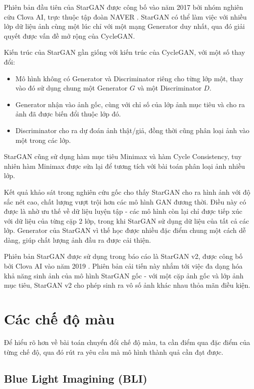 \documentclass[12pt]{extreport}
\begin{document}
Phiên bản đầu tiên của StarGAN được công bố vào năm 2017 bởi nhóm nghiên cứu Clova AI, trực thuộc tập đoàn NAVER \cite{DBLP:journals/corr/abs-1711-09020}. StarGAN có thể làm việc với nhiều lớp dữ liệu ảnh cùng một lúc chỉ với một mạng Generator duy nhất, qua đó giải quyết được vấn đề mở rộng của CycleGAN.

Kiến trúc của StarGAN gần giống với kiến trúc của CycleGAN, với một số thay đổi:
\begin{itemize}
    \item Mô hình không có Generator và Discriminator riêng cho từng lớp một, thay vào đó sử dụng chung một Generator $ G $ và một Discriminator $ D $.
    \item Generator nhận vào ảnh gốc, cùng với chỉ số của lớp ảnh mục tiêu và cho ra ảnh đã được biến đổi thuộc lớp đó.
    \item Discriminator cho ra dự đoán ảnh thật/giả, đồng thời cũng phân loại ảnh vào một trong các lớp.
\end{itemize}

StarGAN cũng sử dụng hàm mục tiêu Minimax và hàm Cycle Consistency, tuy nhiên hàm Minimax được sửa lại để tương tích với bài toán phân loại ảnh nhiều lớp.

Kết quả khảo sát trong nghiên cứu gốc cho thấy StarGAN cho ra hình ảnh với độ sắc nét cao, chất lượng vượt trội hơn các mô hình GAN đương thời. Điều này có được là nhờ ưu thế về dữ liệu luyện tập - các mô hình còn lại chỉ được tiếp xúc với dữ liệu của từng cặp 2 lớp, trong khi StarGAN sử dụng dữ liệu của tất cả các lớp. Generator của StarGAN vì thế học được nhiều đặc điểm chung một cách dễ dàng, giúp chất lượng ảnh đầu ra được cải thiện.

Phiên bản StarGAN được sử dụng trong báo cáo là StarGAN v2, được công bố bởi Clova AI vào năm 2019 \cite{DBLP:journals/corr/abs-1912-01865}. Phiên bản cải tiến này nhắm tới việc đa dạng hóa khả năng sinh ảnh của mô hình StarGAN gốc - với một cặp ảnh gốc và lớp ảnh mục tiêu, StarGAN v2 cho phép sinh ra vô số ảnh khác nhau thỏa mãn điều kiện.

\section{Các chế độ màu}

Để hiểu rõ hơn về bài toán chuyển đổi chế độ màu, ta cần điểm qua đặc điểm của từng chế độ, qua đó rút ra yêu cầu mà mô hình thành quả cần đạt được.

\subsection{Blue Light Imagining (BLI)}
\end{document}
